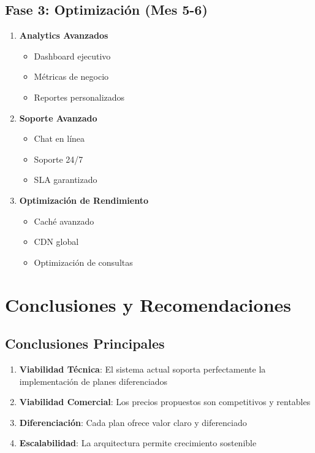 \documentclass[12pt,a4paper]{article}
\begin{document}
\subsection{Fase 3: Optimización (Mes 5-6)}

\begin{enumerate}
    \item \textbf{Analytics Avanzados}
    \begin{itemize}
        \item Dashboard ejecutivo
        \item Métricas de negocio
        \item Reportes personalizados
    \end{itemize}
    
    \item \textbf{Soporte Avanzado}
    \begin{itemize}
        \item Chat en línea
        \item Soporte 24/7
        \item SLA garantizado
    \end{itemize}
    
    \item \textbf{Optimización de Rendimiento}
    \begin{itemize}
        \item Caché avanzado
        \item CDN global
        \item Optimización de consultas
    \end{itemize}
\end{enumerate}

\section{Conclusiones y Recomendaciones}

\subsection{Conclusiones Principales}

\begin{enumerate}
    \item \textbf{Viabilidad Técnica}: El sistema actual soporta perfectamente la implementación de planes diferenciados
    \item \textbf{Viabilidad Comercial}: Los precios propuestos son competitivos y rentables
    \item \textbf{Diferenciación}: Cada plan ofrece valor claro y diferenciado
    \item \textbf{Escalabilidad}: La arquitectura permite crecimiento sostenible
\end{enumerate}
\end{document}
